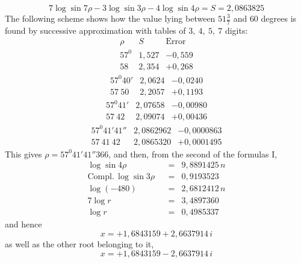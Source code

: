 \[
7\log\sin7\rho-3\log\sin3\rho-4\log\sin4\rho=S=2{,}0863825
\]
The following scheme shows how the value lying between $51\frac37$ and $60$ degrees is found by successive approximation with tables of $3,\ 4,\ 5,\ 7$ digits:
\[
\begin{array}{c|c|c}
\rho&S&\text{Error}\\
57^{0}&1{,}527&-0{,}559\\
58&2{,}354&+0{,}268
\end{array}
\]
\[
\begin{array}{c|c|c}
57^{0}40'&2{,}0624&-0{,}0240\\
57\ 50&2{,}2057&+0{,}1193
\end{array}
\]
\[
\begin{array}{c|c|c}
57^{0}41'&2{,}07658&-0{,}00980\\
57\ 42&2{,}09074&+0{,}00436
\end{array}
\]
\[
\begin{array}{c|c|c}
57^{0}41'41''&2{,}0862962&-0{,}0000863\\
57\ 41\ 42&2{,}0865320&+0{,}0001495
\end{array}
\]
This gives $\rho=57^{0}41'41''366$, and then, from the second of the formulas I,
\[
\begin{array}{lrcl}
\log\sin4\rho&&=&9{,}8891425\,n\\
\mathrm{Compl.}\,\log\sin3\rho&&=&0{,}9193523\\
\log(-480)&&=&2{,}6812412\,n\\\hline
7\log r&&=&3{,}4897360\\
\log r&&=&0{,}4985337
\end{array}
\]
and hence
\[
x=+1{,}6843159+2{,}6637914\,i
\]
as well as the other root belonging to it,
\[
x=+1{,}6843159-2{,}6637914\,i
\]

